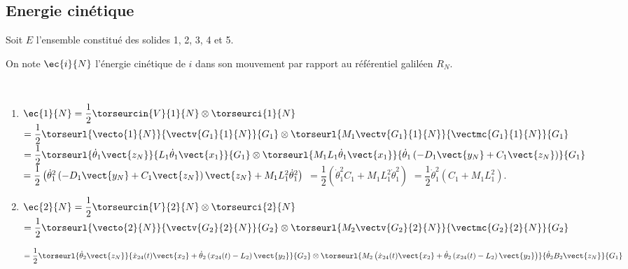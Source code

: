 \begin{multicols}{2}
\subsection*{Energie cinétique}
Soit $E$ l’ensemble constitué des solides 1, 2, 3, 4 et 5.

On note $\ec{i}{N}$ l'énergie cinétique de $i$ dans son mouvement par rapport au référentiel galiléen $R_N$.

\ifprof
\begin{corrige}~\\
\begin{enumerate}
\item $\ec{1}{N}=\dfrac{1}{2}\torseurcin{V}{1}{N}\otimes \torseurci{1}{N}$ 
$=\dfrac{1}{2}\torseurl{\vecto{1}{N}}{\vectv{G_1}{1}{N}}{G_1}\otimes \torseurl{M_1\vectv{G_1}{1}{N}}{\vectmc{G_1}{1}{N}}{G_1}$
$=\dfrac{1}{2}\torseurl{\dot{\theta}_1\vect{z_N}}{L_1 \dot{\theta}_1\vect{x_1}}{G_1}\otimes \torseurl{M_1L_1 \dot{\theta}_1\vect{x_1}}{\dot{\theta}_1\left(-D_1\vect{y_N}+C_1\vect{z_N}\right) }{G_1}$ $=\dfrac{1}{2}\left(\dot{\theta}_1^2\left(-D_1\vect{y_N}+C_1\vect{z_N}\right)\vect{z_N} + M_1L_1^2 \dot{\theta}_1^2 \right)$
$=\dfrac{1}{2}\left(\dot{\theta}_1^2C_1 + M_1L_1^2 \dot{\theta}_1^2 \right)$
$=\dfrac{1}{2}\dot{\theta}_1^2\left(C_1 + M_1L_1^2  \right)$.

\item $\ec{2}{N}=\dfrac{1}{2}\torseurcin{V}{2}{N}\otimes \torseurci{2}{N}$ 
$=\dfrac{1}{2}\torseurl{\vecto{2}{N}}{\vectv{G_2}{2}{N}}{G_2}\otimes \torseurl{M_2\vectv{G_2}{2}{N}}{\vectmc{G_2}{2}{N}}{G_2}$

$=\dfrac{1}{2}
\torseurl{\dot{\theta}_2\vect{z_N}}{\dot{x}_{24}(t)  \vect{x_2}+\dot{\theta}_2\left(  x_{24}(t)  -L_2 \right)\vect{y_2}}{G_2}
\otimes 
\torseurl{M_2\left(\dot{x}_{24}(t)  \vect{x_2}+\dot{\theta}_2\left(  x_{24}(t)  -L_2 \right)\vect{y_2}\right)}{\dot{\theta}_2 B_2 \vect{z_N} }{G_1}
$ 


\end{enumerate}
\end{corrige}
\end{multicols}
